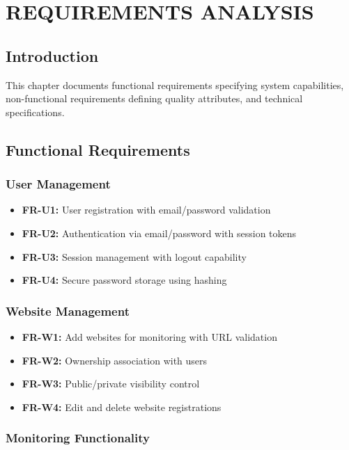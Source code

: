 \chapter{REQUIREMENTS ANALYSIS}
\label{chap:requirements}

\section{Introduction}

This chapter documents functional requirements specifying system capabilities, non-functional requirements defining quality attributes, and technical specifications.

\section{Functional Requirements}

\subsection{User Management}

\begin{itemize}
    \item \textbf{FR-U1:} User registration with email/password validation
    \item \textbf{FR-U2:} Authentication via email/password with session tokens
    \item \textbf{FR-U3:} Session management with logout capability
    \item \textbf{FR-U4:} Secure password storage using hashing
\end{itemize}

\subsection{Website Management}

\begin{itemize}
    \item \textbf{FR-W1:} Add websites for monitoring with URL validation
    \item \textbf{FR-W2:} Ownership association with users
    \item \textbf{FR-W3:} Public/private visibility control
    \item \textbf{FR-W4:} Edit and delete website registrations
\end{itemize}

\subsection{Monitoring Functionality}

